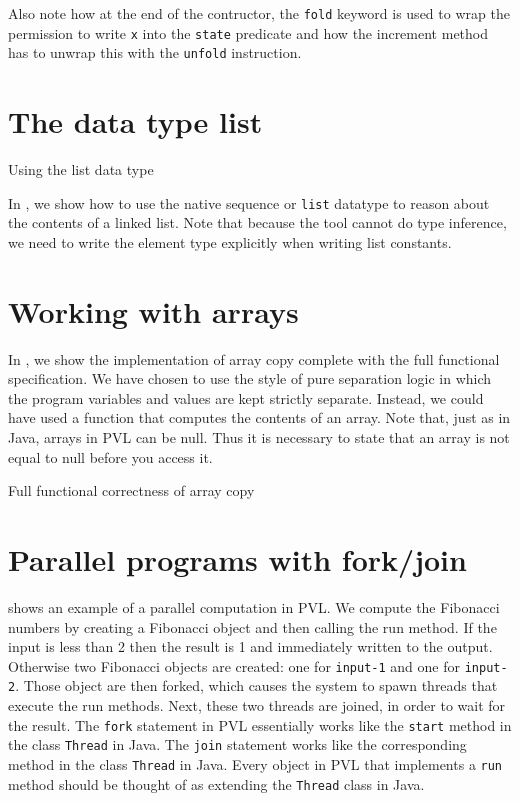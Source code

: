 Also note how at the end of the contructor,
the \lstinline+fold+ keyword is used to wrap the permission
to write \lstinline+x+ into the \lstinline+state+ predicate and how the increment
method has to unwrap this with the \lstinline+unfold+ instruction.

\section{The data type list}\label{sec:list}
\label{list examples}

\begin{listing}

\caption{Using the list data type}
\label{list}
\end{listing}

In , we show how to use the native sequence or \lstinline+list+ datatype
to reason about the contents of a linked list. Note that because the tool
cannot do type inference, we need to write the element type explicitly
when writing list constants.


\section{Working with arrays}\label{sec:arrays}

In , we show the implementation of array copy complete with the full functional specification.
We have chosen to use the style of pure separation logic in which
the program variables and values are kept strictly separate.
Instead, we could have used a function that computes the contents of an array.
Note that, just as in Java, arrays in PVL can be null. Thus it is
necessary to state that an array is not equal to null before 
you access it.


\begin{listing}

\caption{Full functional correctness of array copy}
\label{array copy}
\end{listing}

\section{Parallel programs with fork/join}\label{sec:forkjoin}


 shows an example of a parallel computation
in PVL. We compute the Fibonacci numbers by creating a Fibonacci object
and then calling the run method. If the input is less than 2 then the result is
1 and immediately written to the output. Otherwise two Fibonacci objects are created: one for \lstinline+input-1+ and
one for \lstinline+input-2+. Those object are then forked, which causes the system
to spawn threads that execute the run methods. Next, these two threads are joined, in order to wait for the result.
The \lstinline+fork+ statement in PVL essentially works like the \lstinline+start+ method in the
class \lstinline+Thread+ in Java. The \lstinline+join+ statement works like the corresponding
method in the class \lstinline+Thread+ in Java. Every object in PVL that implements a \lstinline+run+ method
should be thought of as extending the \lstinline+Thread+ class in Java.

